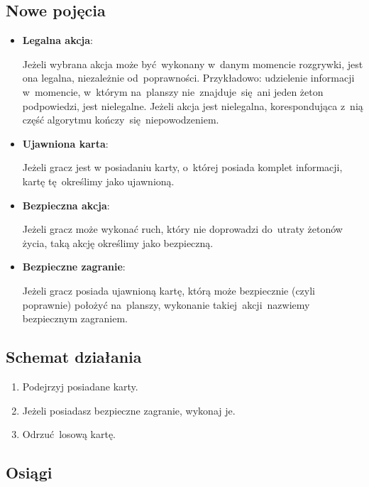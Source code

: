 \documentclass[declaration,shortabstract,inz]{iithesis}
\begin{document}
\subsection*{Nowe pojęcia}

\begin{itemize}

	\item \textbf{Legalna akcja}:
	
	Jeżeli wybrana akcja może być wykonany w~danym momencie rozgrywki, jest ona legalna, niezależnie od~poprawności. Przykładowo: udzielenie informacji w~momencie, w~którym na~planszy nie~znajduje~się ani jeden żeton podpowiedzi, jest nielegalne. Jeżeli akcja jest nielegalna, korespondująca z~nią część algorytmu kończy~się niepowodzeniem.
	
	\item \textbf{Ujawniona karta}:
	
	Jeżeli gracz jest w posiadaniu karty, o~której posiada komplet informacji, kartę tę~określimy jako ujawnioną.
	
	\item \textbf{Bezpieczna akcja}:
	
	Jeżeli gracz może wykonać ruch, który nie doprowadzi do~utraty żetonów życia, taką akcję określimy jako bezpieczną.
	
	\item \textbf{Bezpieczne zagranie}:
	
	Jeżeli gracz posiada ujawnioną kartę, którą może bezpiecznie (czyli poprawnie) położyć na~planszy, wykonanie takiej akcji nazwiemy bezpiecznym zagraniem.
\end{itemize}

\subsection*{Schemat działania}

\begin{enumerate}
	\item Podejrzyj posiadane karty.
	\item Jeżeli posiadasz bezpieczne zagranie, wykonaj je.
	\item Odrzuć losową kartę.
\end{enumerate}

\subsection*{Osiągi}
\end{document}
